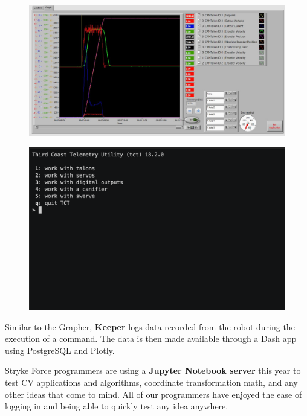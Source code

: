 \documentclass[10pt,tumble]{leaflet}
\begin{document}
\begin{figure}[H]
	\centering
	\includegraphics[scale=0.2]{assets/grapher}
\end{figure}

\begin{figure}[H]
	\centering
	\includegraphics[scale=0.35]{assets/tct}
\end{figure}

Similar to the Grapher, \textbf{Keeper} logs data recorded from the robot during the execution of a command. The data is then made available through a Dash app using PostgreSQL and Plotly.

Stryke Force programmers are using a \textbf{Jupyter Notebook server} this year to test CV applications and algorithms, coordinate transformation math, and any other ideas that come to mind. All of our programmers have enjoyed the ease of logging in and being able to quickly test any idea anywhere.
\end{document}
